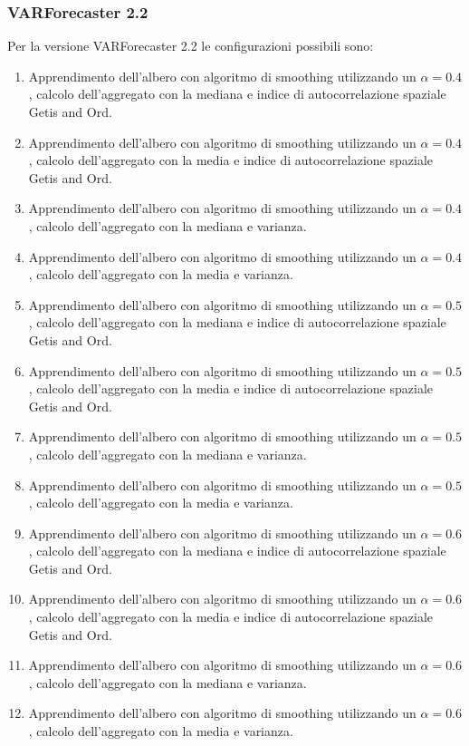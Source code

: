 \documentclass[12pt,a4paper,oneside,openright]{book}
\begin{document}
\newpage
\subsubsection{VARForecaster 2.2}


Per la versione VARForecaster 2.2 le configurazioni possibili sono:
\begin{enumerate}
\item Apprendimento dell'albero con algoritmo di smoothing utilizzando un $ \alpha = 0.4$, calcolo dell'aggregato con la mediana e indice di autocorrelazione spaziale Getis and Ord.
\item Apprendimento dell'albero con algoritmo di smoothing utilizzando un $ \alpha = 0.4$, calcolo dell'aggregato con la media e indice di autocorrelazione spaziale Getis and Ord.
\item Apprendimento dell'albero con algoritmo di smoothing utilizzando un $ \alpha = 0.4$, calcolo dell'aggregato con la mediana e varianza.
\item Apprendimento dell'albero con algoritmo di smoothing utilizzando un $ \alpha = 0.4$, calcolo dell'aggregato con la media e varianza.
\item Apprendimento dell'albero con algoritmo di smoothing utilizzando un $ \alpha = 0.5$, calcolo dell'aggregato con la mediana e indice di autocorrelazione spaziale Getis and Ord.
\item Apprendimento dell'albero con algoritmo di smoothing utilizzando un $ \alpha = 0.5$, calcolo dell'aggregato con la media e indice di autocorrelazione spaziale Getis and Ord.
\item Apprendimento dell'albero con algoritmo di smoothing utilizzando un $ \alpha = 0.5$, calcolo dell'aggregato con la mediana e varianza.
\item Apprendimento dell'albero con algoritmo di smoothing utilizzando un $ \alpha = 0.5$, calcolo dell'aggregato con la media e varianza.
\item Apprendimento dell'albero con algoritmo di smoothing utilizzando un $ \alpha = 0.6$, calcolo dell'aggregato con la mediana e indice di autocorrelazione spaziale Getis and Ord.
\item Apprendimento dell'albero con algoritmo di smoothing utilizzando un $ \alpha = 0.6$, calcolo dell'aggregato con la media e indice di autocorrelazione spaziale Getis and Ord.
\item Apprendimento dell'albero con algoritmo di smoothing utilizzando un $ \alpha = 0.6$, calcolo dell'aggregato con la mediana e varianza.
\item Apprendimento dell'albero con algoritmo di smoothing utilizzando un $ \alpha = 0.6$, calcolo dell'aggregato con la media e varianza.
\end{enumerate}
\end{document}
